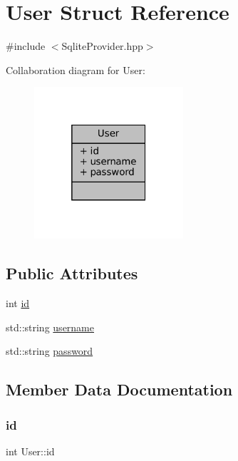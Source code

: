 \hypertarget{structUser}{}\section{User Struct Reference}
\label{structUser}


{\ttfamily \#include $<$Sqlite\+Provider.\+hpp$>$}



Collaboration diagram for User\+:
\nopagebreak
\begin{figure}[H]
\begin{center}
\leavevmode
\includegraphics[width=157pt]{structUser__coll__graph}
\end{center}
\end{figure}
\subsection*{Public Attributes}
\begin{DoxyCompactItemize}
\item 
int \mbox{\hyperlink{structUser_aa7e6e39b43020bbe9c3a196b3689b0f7}{id}}
\item 
std\+::string \mbox{\hyperlink{structUser_aacbb807e514280f69e00bec7d71f3aee}{username}}
\item 
std\+::string \mbox{\hyperlink{structUser_ac2f2e75b15e8eb6cbb030fc85a6cd59f}{password}}
\end{DoxyCompactItemize}


\subsection{Member Data Documentation}
\mbox{\label{structUser_aa7e6e39b43020bbe9c3a196b3689b0f7}} 
\subsubsection{\texorpdfstring{id}{id}}
{\footnotesize\ttfamily int User\+::id}

